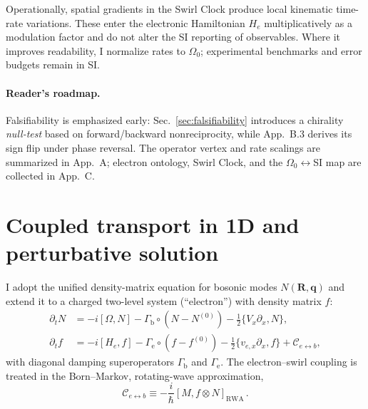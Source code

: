 \documentclass[aps,prb,preprint,amsmath,amssymb]{revtex4-2} %
\begin{document}
        Operationally, spatial gradients in the Swirl Clock produce local kinematic time-rate variations. These enter the electronic Hamiltonian $H_e$ multiplicatively as a modulation factor and do not alter the SI reporting of observables. Where it improves readability, I normalize rates to $\Omega_0$; experimental benchmarks and error budgets remain in SI.

        \paragraph*{Reader’s roadmap.}
            Falsifiability is emphasized early: Sec.~\ref{sec:falsifiability} introduces a chirality \emph{null-test} based on forward/backward nonreciprocity, while App.~B.3 derives its sign flip under phase reversal. The operator vertex and rate scalings are summarized in App.~A; electron ontology, Swirl Clock, and the $\Omega_0\!\leftrightarrow$SI map are collected in App.~C.

    \section{Coupled transport in 1D and perturbative solution}
        I adopt the unified density-matrix equation for bosonic modes $N(\mathbf R,\mathbf q)$ \cite{Simoncelli2022} and extend it to a charged two-level system (``electron'') with density matrix $f$:
        \begin{align}
            \partial_t N &= -i[\Omega,N] - \Gamma_\mathrm{b} \circ (N-N^{(0)}) - \tfrac12\{ V_x \partial_x, N\},\label{eq:Ndyn}\\
            \partial_t f &= -i[H_e,f] - \Gamma_\mathrm{e}\circ(f-f^{(0)}) - \tfrac12\{ v_{e,x}\partial_x, f\} + \mathcal C_{e\leftrightarrow b},\label{eq:fdyn}
        \end{align}
        with diagonal damping superoperators $\Gamma_\mathrm{b}$ and $\Gamma_\mathrm{e}$. The electron--swirl coupling is treated in the Born--Markov, rotating-wave approximation,
        \begin{equation}
            \mathcal C_{e\leftrightarrow b} \equiv -\frac{i}{\hbar}[M, f\otimes N]_{\mathrm{RWA}}\,.
        \end{equation}
\end{document}
